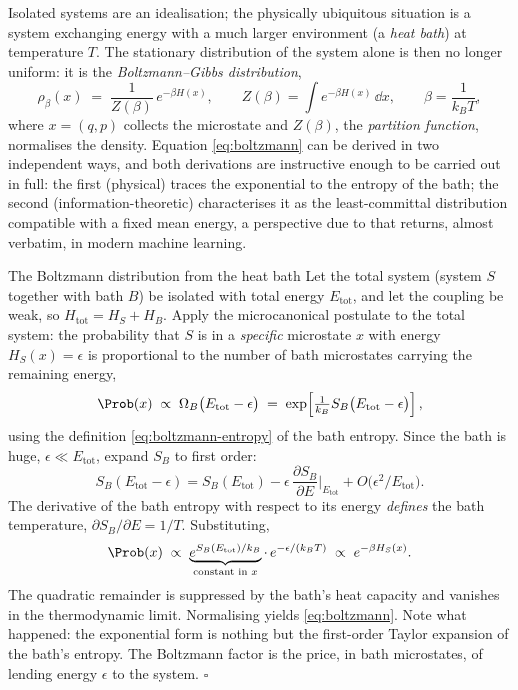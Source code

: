 Isolated systems are an idealisation; the physically ubiquitous situation
is a system exchanging energy with a much larger environment (a
\emph{heat bath}) at temperature $T$. The stationary distribution of the
system alone is then no longer uniform: it is the
\emph{Boltzmann--Gibbs distribution},
\begin{equation}
  \boxed{\;
  \rho_\beta(x) \;=\; \frac{1}{Z(\beta)}\, e^{-\beta H(x)},
  \qquad
  Z(\beta) = \int e^{-\beta H(x)}\,\dd x,
  \qquad
  \beta = \frac{1}{k_B T},
  \;}
  \label{eq:boltzmann}
\end{equation}
where $x = (q,p)$ collects the microstate and $Z(\beta)$, the
\emph{partition function}, normalises the density. Equation
\eqref{eq:boltzmann} can be derived in two independent ways, and both
derivations are instructive enough to be carried out in full: the first
(physical) traces the exponential to the entropy of the bath; the second
(information-theoretic) characterises it as the least-committal
distribution compatible with a fixed mean energy, a perspective due to
\citet{jaynes1957information} that returns, almost verbatim, in modern
machine learning.

\begin{toolbox}{The Boltzmann distribution from the heat bath}
Let the total system (system $S$ together with bath $B$) be isolated with
total energy $E_{\mathrm{tot}}$, and let the coupling be weak, so
$H_{\mathrm{tot}} = H_S + H_B$. Apply the microcanonical postulate to the
total system: the probability that $S$ is in a \emph{specific} microstate
$x$ with energy $H_S(x) = \epsilon$ is proportional to the number of bath
microstates carrying the remaining energy,
\begin{equation*}
  \Prob(x) \;\propto\; \Omega_B\big(E_{\mathrm{tot}} - \epsilon\big)
  \;=\; \exp\!\left[ \tfrac{1}{k_B} S_B\big(E_{\mathrm{tot}} - \epsilon\big) \right],
\end{equation*}
using the definition \eqref{eq:boltzmann-entropy} of the bath entropy.
Since the bath is huge, $\epsilon \ll E_{\mathrm{tot}}$, expand $S_B$ to
first order:
\begin{equation*}
  S_B(E_{\mathrm{tot}} - \epsilon)
  = S_B(E_{\mathrm{tot}})
  - \epsilon \,\frac{\partial S_B}{\partial E}\Big|_{E_{\mathrm{tot}}}
  + O\!\big(\epsilon^2 / E_{\mathrm{tot}}\big).
\end{equation*}
The derivative of the bath entropy with respect to its energy
\emph{defines} the bath temperature,
$\partial S_B / \partial E = 1/T$. Substituting,
\begin{equation*}
  \Prob(x) \;\propto\;
  \underbrace{e^{S_B(E_{\mathrm{tot}})/k_B}}_{\text{constant in } x}
  \cdot\, e^{-\epsilon/(k_B T)}
  \;\propto\; e^{-\beta H_S(x)} .
\end{equation*}
The quadratic remainder is suppressed by the bath's heat capacity and
vanishes in the thermodynamic limit. Normalising yields
\eqref{eq:boltzmann}. Note what happened: the exponential form is nothing
but the first-order Taylor expansion of the bath's entropy. The Boltzmann
factor is the price, in bath microstates, of lending energy $\epsilon$ to
the system. \hfill$\square$
\end{toolbox}

